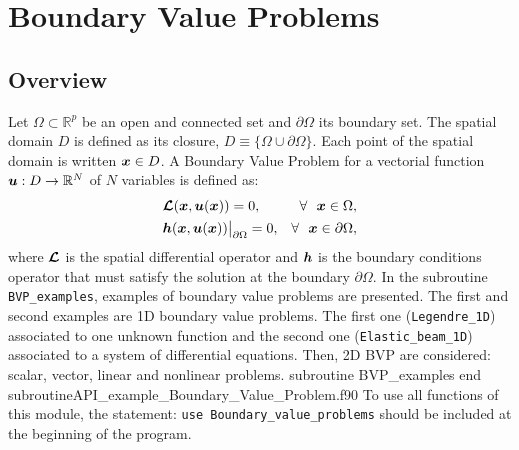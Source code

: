      
\chapter{Boundary Value Problems   }\label{BVP}
\vspace{-1cm}
\section{Overview}
Let  $\Omega \subset \mathbb{ R}^p$ be an open and connected set and $\partial \Omega$ its boundary set. The spatial domain $D$ is defined as 
its closure, $D \equiv \{\Omega \cup \partial \Omega\}$. Each point of the spatial domain is written  $\boldsymbol{x} \in D $.
A Boundary Value Problem for a vectorial function $\boldsymbol{u}: D \rightarrow \mathbb{R}^{N}$ of $N$ variables is defined as:
       \begin{align*}
           &\boldsymbol{\mathcal{L}} (\boldsymbol{x},\boldsymbol{u}(\boldsymbol{x})) = 0, & \forall \ \ \boldsymbol{x} \in  \Omega, \\
           &\boldsymbol{h} (\boldsymbol{x},\boldsymbol{u}(\boldsymbol{x}))\big\rvert_{\partial \Omega}=0 ,  & \forall \ \ \boldsymbol{x} \in \partial \Omega,
       \end{align*}
where $\boldsymbol{\mathcal{L}}$ is the spatial differential operator and $\boldsymbol{h}$ is the boundary conditions operator that must satisfy the 
solution at the boundary $\partial \Omega$.
In the subroutine \verb|BVP_examples|, examples of boundary value problems are presented.
The first and second examples are 1D boundary value problems. 
The first one (\verb|Legendre_1D|) associated to one unknown function 
and the second one (\verb|Elastic_beam_1D|) associated to a system of differential equations. 
Then, 2D BVP are considered: scalar, vector, linear and nonlinear problems. 
       \vspace{0.2cm} 
       {subroutine BVP_examples}
       {end subroutine}{API_example_Boundary_Value_Problem.f90}
\vspace{-0.5cm}       
To  use all functions of this module, the statement: 
 \verb|use Boundary_value_problems|
 should be included at the beginning of the program.          
  
